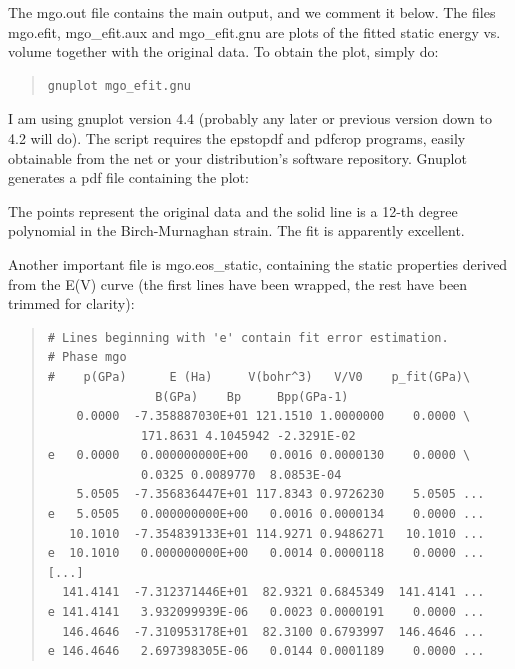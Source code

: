 \documentclass[a4paper]{article}
\begin{document}
The mgo.out file contains the main output, and we comment it
below. The files mgo.efit, mgo\_efit.aux and mgo\_efit.gnu are plots of
the fitted static energy vs. volume together with the original
data. To obtain the plot, simply do:
%
\begin{quote}
\begin{verbatim}
gnuplot mgo_efit.gnu
\end{verbatim}
\end{quote}

I am using gnuplot version 4.4 (probably any later or previous version
down to 4.2 will do). The script requires the epstopdf and pdfcrop
programs, easily obtainable from the net or your distribution's
software repository. Gnuplot generates a pdf file containing the plot:

\noindent{}

The points represent the original data and the solid line is a 12-th
degree polynomial in the Birch-Murnaghan strain. The fit is apparently
excellent.

Another important file is mgo.eos\_static, containing the static
properties derived from the E(V) curve (the first lines have been
wrapped, the rest have been trimmed for clarity):
%
\begin{quote}
\begin{verbatim}
# Lines beginning with 'e' contain fit error estimation.
# Phase mgo
#    p(GPa)      E (Ha)     V(bohr^3)   V/V0    p_fit(GPa)\
               B(GPa)    Bp     Bpp(GPa-1)
    0.0000  -7.358887030E+01 121.1510 1.0000000    0.0000 \
             171.8631 4.1045942 -2.3291E-02
e   0.0000   0.000000000E+00   0.0016 0.0000130    0.0000 \
             0.0325 0.0089770  8.0853E-04
    5.0505  -7.356836447E+01 117.8343 0.9726230    5.0505 ...
e   5.0505   0.000000000E+00   0.0016 0.0000134    0.0000 ...
   10.1010  -7.354839133E+01 114.9271 0.9486271   10.1010 ...
e  10.1010   0.000000000E+00   0.0014 0.0000118    0.0000 ...
[...]
  141.4141  -7.312371446E+01  82.9321 0.6845349  141.4141 ...
e 141.4141   3.932099939E-06   0.0023 0.0000191    0.0000 ...
  146.4646  -7.310953178E+01  82.3100 0.6793997  146.4646 ...
e 146.4646   2.697398305E-06   0.0144 0.0001189    0.0000 ...
\end{verbatim}
\end{quote}
\end{document}
